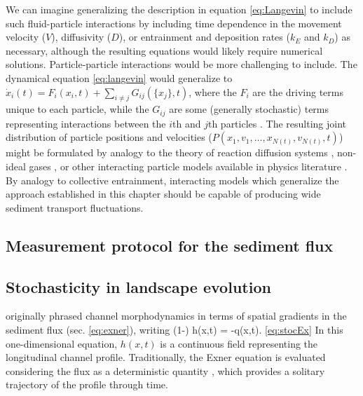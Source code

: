 We can imagine generalizing the description in equation \ref{eq:Langevin} to include such fluid-particle interactions by including time dependence in the movement velocity ($V$), diffusivity ($D$), or entrainment and deposition rates ($k_E$ and $k_D$) as necessary, although the resulting equations would likely require numerical solutions.
Particle-particle interactions would be more challenging to include.
The dynamical equation \ref{eq:langevin} would generalize to $\dot{x}_i(t) = F_i(x_i,t) + \sum_{i\neq j}G_{ij}(\{x_j\},t)$, where the $F_i$ are the driving terms unique to each particle, while the $G_{ij}$ are some (generally stochastic) terms representing interactions between the $i$th and $j$th particles \citep{Goldstein1997}. The resulting joint distribution of particle positions and velocities ($P(x_1,v_1,\dots,x_{N(t)},v_{N(t)},t)$) might be formulated by analogy to the theory of reaction diffusion systems \citep{Pechenik1999, Cardy2008}, non-ideal gases \citep{Chapman1970,Brilliantov2004}, or other interacting particle models available in physics literature \citep{Hernandez2004,Escaff2018}. 
By analogy to collective entrainment, interacting models which generalize the approach established in this chapter should be capable of producing wide sediment transport fluctuations.

\subsection{Measurement protocol for the sediment flux}




\subsection{Stochasticity in landscape evolution}

\citet{Exner1925} originally phrased channel morphodynamics in terms of spatial gradients in the sediment flux (sec. \ref{eq:exner}), writing
\be (1-\phi) \pt h(x,t) = -\px q(x,t). \ref{eq:stocEx}\ee
In this one-dimensional equation, $h(x,t)$ is a continuous field representing the longitudinal channel profile.
Traditionally, the Exner equation is evaluated considering the flux as a deterministic quantity \citep{Parker2007,Viparelli2011,An2017}, which provides a solitary trajectory of the profile through time.

